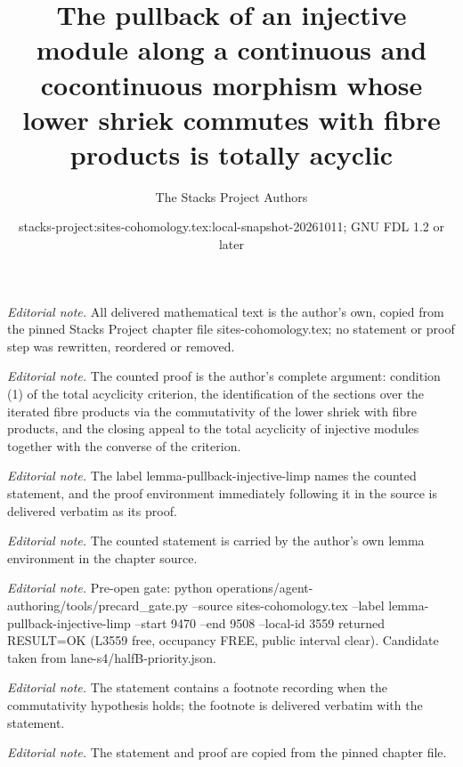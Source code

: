 \documentclass[10pt,a4paper]{amsart}
\title{The pullback of an injective module along a continuous and cocontinuous morphism whose lower shriek commutes with fibre products is totally acyclic}
\author{The Stacks Project Authors}
\date{stacks-project:sites-cohomology.tex:local-snapshot-20261011; GNU FDL 1.2 or later}
\theoremstyle{plain}
\theoremstyle{definition}
\theoremstyle{remark}
\numberwithin{equation}{subsection}
\begin{document}
\maketitle
\noindent\textit{Editorial note.} All delivered mathematical text is the author's own, copied from the pinned Stacks Project chapter file sites-cohomology.tex; no statement or proof step was rewritten, reordered or removed.\par\medskip
\noindent\textit{Editorial note.} The counted proof is the author's complete argument: condition (1) of the total acyclicity criterion, the identification of the sections over the iterated fibre products via the commutativity of the lower shriek with fibre products, and the closing appeal to the total acyclicity of injective modules together with the converse of the criterion.\par\medskip
\noindent\textit{Editorial note.} The label lemma-pullback-injective-limp names the counted statement, and the proof environment immediately following it in the source is delivered verbatim as its proof.\par\medskip
\noindent\textit{Editorial note.} The counted statement is carried by the author's own lemma environment in the chapter source.\par\medskip
\noindent\textit{Editorial note.} Pre-open gate: python operations/agent-authoring/tools/precard\_gate.py --source sites-cohomology.tex --label lemma-pullback-injective-limp --start 9470 --end 9508 --local-id 3559 returned RESULT=OK (L3559 free, occupancy FREE, public interval clear). Candidate taken from lane-s4/halfB-priority.json.\par\medskip
\noindent\textit{Editorial note.} The statement contains a footnote recording when the commutativity hypothesis holds; the footnote is delivered verbatim with the statement.\par\medskip
\noindent\textit{Editorial note.} The statement and proof are copied from the pinned chapter file.\par\medskip
\end{document}
